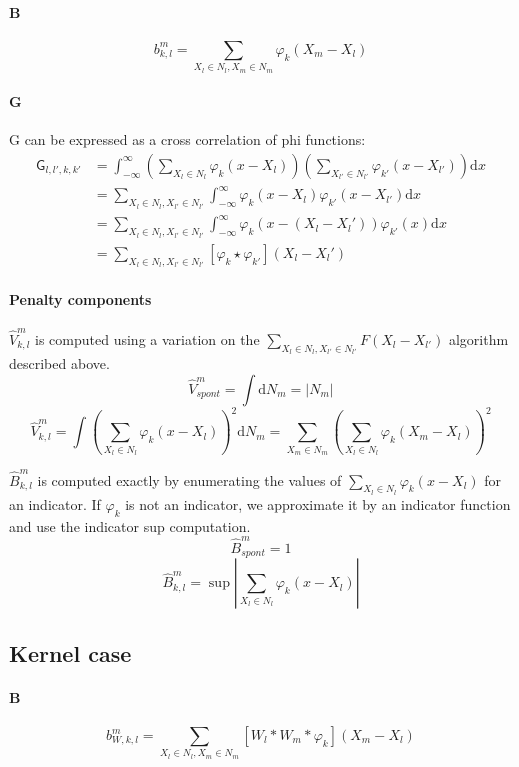 \documentclass[a4paper,10pt]{article}
\newcommand\D{\mathrm{d}}
\newcommand\Convolution{\ast}
\newcommand\Correlation{\star}
\newcommand\Int[2]{\int #1 \D#2}
\newcommand\IntR[2]{\int_{-\infty}^{\infty}#1 \D#2}
\begin{document}
\paragraph{B}
\[ b_{k,l}^m = \sum_{X_l \in N_l, X_m \in N_m} \varphi_k (X_m - X_l) \]

\paragraph{G}
G can be expressed as a cross correlation of phi functions:
\[ \begin{split}
    \mathsf{G}_{l,l',k,k'} & = \IntR{\left( \sum_{X_l \in N_l} \varphi_k(x-X_l) \right)\left( \sum_{X_{l'} \in N_{l'}} \varphi_{k'}(x-X_{l'}) \right)}{x} \\
    & = \sum_{X_l \in N_l, X_{l'} \in N_{l'}} \IntR{ \varphi_k(x-X_l) \varphi_{k'}(x-X_{l'}) }{x} \\
    & = \sum_{X_l \in N_l, X_{l'} \in N_{l'}} \IntR{ \varphi_k(x-(X_l-X_l')) \varphi_{k'}(x) }{x} \\
    & = \sum_{X_l \in N_l, X_{l'} \in N_{l'}} [\varphi_k \Correlation \varphi_{k'}] (X_l-X_l')
\end{split} \]

\paragraph{Penalty components}
$\widehat{V}_{k,l}^m$ is computed using a variation on the $\sum_{X_l \in N_l, X_{l'} \in N_{l'}} F(X_l-X_{l'})$ algorithm described above.
\[ \widehat{V}_{spont}^m = \Int{}{N_m} = |N_m| \]
\[
    \widehat{V}_{k,l}^m =
    \Int{\left( \sum_{X_l \in N_l} \varphi_k(x-X_l) \right)^2}{N_m} =
    \sum_{X_m \in N_m} \left( \sum_{X_l \in N_l} \varphi_k(X_m-X_l) \right)^2
\]

$\widehat{B}_{k,l}^m$ is computed exactly by enumerating the values of $\sum_{X_l \in N_l} \varphi_k(x - X_l)$ for an indicator.
If $\varphi_k$ is not an indicator, we approximate it by an indicator function and use the indicator sup computation.
\[ \widehat{B}_{spont}^m = 1 \]
\[ \widehat{B}_{k,l}^m = \sup |\sum_{X_l \in N_l} \varphi_k(x - X_l)| \]

\subsection{Kernel case}

\paragraph{B}
\[ b_{W,k,l}^m = \sum_{X_l \in N_l, X_m \in N_m} [W_l \Convolution W_m \Convolution \varphi_k] (X_m - X_l) \]
\end{document}
